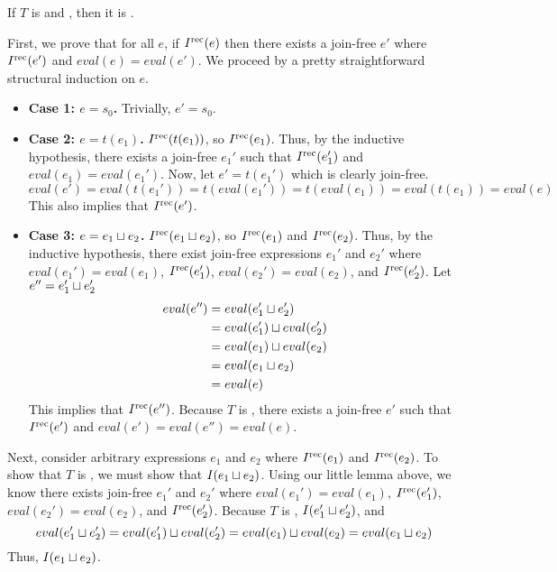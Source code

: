 \begin{claim}
  If $T$ is \dIconfluent{} and \dIreducible, then it is \Iconfluent.
\end{claim}
\begin{elidableproof}
  First, we prove that for all $e$, if $I^{\text{rec}}(e)$ then there exists a join-free
  $e'$ where $I^{\text{rec}}(e')$ and $eval(e) = eval(e')$. We proceed by a pretty
  straightforward structural induction on $e$.
  \begin{itemize}
    \item \textbf{Case 1: $e = s_0$.}
      Trivially, $e' = s_0.$

    \item \textbf{Case 2: $e = t(e_1)$.}
      $I^{\text{rec}}(t(e_1))$, so $I^{\text{rec}}(e_1)$. Thus, by the inductive hypothesis,
      there exists a join-free $e_1'$ such that $I^{\text{rec}}(e_1')$ and $eval(e_1) =
      eval(e_1')$. Now, let $e' = t(e_1')$ which is clearly join-free.
      \[
        eval(e')
          = eval(t(e_1'))
          = t(eval(e_1'))
          = t(eval(e_1))
          = eval(t(e_1))
          = eval(e)
      \]
      This also implies that $I^{\text{rec}}(e')$.

    \item \textbf{Case 3: $e = e_1 \sqcup e_2$.}
      $I^{\text{rec}}(e_1 \sqcup e_2)$, so $I^{\text{rec}}(e_1)$ and $I^{\text{rec}}(e_2)$. Thus, by the
      inductive hypothesis, there exist join-free expressions $e_1'$ and $e_2'$
      where $eval(e_1') = eval(e_1)$, $I^{\text{rec}}(e_1')$, $eval(e_2') = eval(e_2)$,
      and $I^{\text{rec}}(e_2')$. Let $e'' = e_1' \sqcup e_2'$
      \begin{align*}
        eval(e'')
        &= eval(e_1' \sqcup e_2') \\
        &= eval(e_1') \sqcup eval(e_2') \\
        &= eval(e_1) \sqcup eval(e_2) \\
        &= eval(e_1 \sqcup e_2) \\
        &= eval(e)
      \end{align*}
      This implies that $I^{\text{rec}}(e'')$. Because $T$ is \dIreducible, there exists
      a join-free $e'$ such that $I^{\text{rec}}(e')$ and $eval(e') = eval(e'') =
      eval(e)$.
  \end{itemize}

  Next, consider arbitrary expressions $e_1$ and $e_2$ where $I^{\text{rec}}(e_1)$ and
  $I^{\text{rec}}(e_2)$. To show that $T$ is \Iconfluent, we must show that $I(e_1 \sqcup
  e_2)$. Using our little lemma above, we know there exists join-free $e_1'$
  and $e_2'$ where $eval(e_1') = eval(e_1)$, $I^{\text{rec}}(e_1')$, $eval(e_2') =
  eval(e_2)$, and $I^{\text{rec}}(e_2')$. Because $T$ is \dIconfluent, $I(e_1' \sqcup
  e_2')$, and
  \[
    eval(e_1' \sqcup e_2')
      = eval(e_1') \sqcup eval(e_2')
      = eval(e_1) \sqcup eval(e_2)
      = eval(e_1 \sqcup e_2)
  \]
  Thus, $I(e_1 \sqcup e_2)$.
\end{elidableproof}

